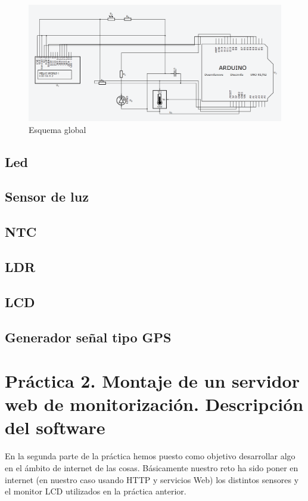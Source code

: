 \documentclass[]{article}
\begin{document}
\begin{figure}[h!]
	\centering
	\includegraphics[width=0.6\linewidth]{images/squema.PNG}
	\caption{Esquema global}
	\label{fig:squema}
\end{figure}


\subsection{Led}

\subsection{Sensor de luz}

\subsection{NTC}

\subsection{LDR}

\subsection{LCD}

\subsection{Generador señal tipo GPS}




\section{Práctica 2. Montaje de un servidor web de monitorización. Descripción del software}

En la segunda parte de la práctica hemos puesto como objetivo desarrollar algo en el ámbito de internet de las cosas. Básicamente nuestro reto ha sido poner en internet (en nuestro caso usando HTTP y servicios Web) los distintos sensores y el monitor LCD utilizados en la práctica anterior.
\end{document}
